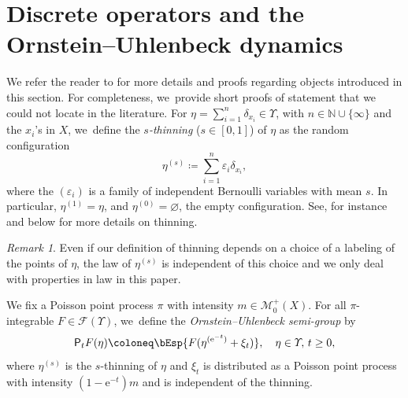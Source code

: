 \documentclass[10pt]{amsart}
\theoremstyle{definition}
\theoremstyle{remark}
\newtheorem{remark}[theorem]{Remark}
\begin{document}
\section{Discrete operators and the Ornstein--Uhlenbeck dynamics}\label{s:ou}
\label{s:mehler}
We refer the reader to \cite{LastAnaSto} for more details and proofs regarding objects introduced in this section.
For completeness, we~provide short proofs of statement that we could not locate in the literature.
For $\eta = \sum_{i=1}^{n} \delta_{x_{i}} \in \varUpsilon$, with $n \in \mathbb{N} \cup \{ \infty\}$ and the $x_{i}$'s in $X$, we~define the \emph{$s$-thinning} ($s \in [0,1]$) of $\eta$ as the random configuration
\begin{equation*}
\eta^{(s)} \coloneq \sum_{i=1}^{n} \varepsilon_{i} \delta_{x_{i}},
\end{equation*}
where the $(\varepsilon_{i})$ is a family of independent Bernoulli variables with mean $s$.
In particular, $\eta^{(1)} = \eta$, and $\eta^{(0)} = \varnothing$, the empty configuration.
See, for instance~\cite[Def.\,5.7]{LastPenrose} and below for more details on thinning.
\begin{remark}
Even if our definition of thinning depends on a choice of a labeling of the points of $\eta$, the law of $\eta^{(s)}$ is independent of this choice and we only deal with properties in law in this paper.
\end{remark}

We fix a Poisson point process $\pi$ with intensity $m \in \mathscr{M}_{0}^{+}(X)$.
For all $\pi$-integrable $F \in \mathscr{F}(\varUpsilon)$, we~define the \emph{Ornstein--Uhlenbeck semi-group} by
\begin{equation*}
\mathsf{P}_{t} F(\eta) \coloneq \bEsp{ F(\eta^{(\mathrm{e}^{-t})} + \xi_{t}) }, \quad \eta \in \varUpsilon,\, t \ge 0,
\end{equation*}
where $\eta^{(s)}$ is the $s$-thinning of $\eta$ and $\xi_{t}$ is distributed as a Poisson point process with intensity $(1-\mathrm{e}^{-t})m$ and is independent of the thinning.
\end{document}
